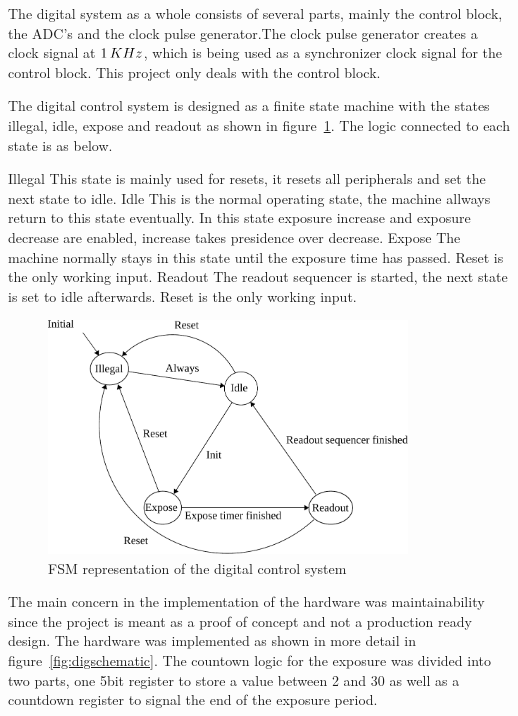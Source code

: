 The digital system as a whole consists of several parts, mainly the control block, the ADC's and the clock pulse generator.The clock pulse generator creates a clock signal at $1 \mskip3mu KHz$, which is being used as a synchronizer clock signal for the control block.
This project only deals with the control block.

The digital control system is designed as a finite state machine with the states illegal, idle, expose and readout as shown in figure~\ref{fig:fsmDiagram}.
The logic connected to each state is as below.

\begin{outline}
  \1 Illegal
  \2 This state is mainly used for resets, it resets all peripherals and set the next state to idle.
  \1 Idle
  \2 This is the normal operating state, the machine allways return to this state eventually.
  \2 In this state exposure increase and exposure decrease are enabled, increase takes presidence over decrease.
  \1 Expose
  \2 The machine normally stays in this state until the exposure time has passed.
  \2 Reset is the only working input.
  \1 Readout
  \2 The readout sequencer is started, the next state is set to idle afterwards.
  \2 Reset is the only working input.
\end{outline}

\begin{figure}[p]
  \centering
  \includegraphics[width=0.85\textwidth]{figures/fsmDiagram}
  \caption{FSM representation of the digital control system}
  \label{fig:fsmDiagram}
\end{figure}

The main concern in the implementation of the hardware was maintainability since the project is meant as a proof of concept and not a production ready design.
The hardware was implemented as shown in more detail in figure~\ref{fig:digschematic}.
The countown logic for the exposure was divided into two parts, one 5bit register to store a value between 2 and 30 as well as a countdown register
to signal the end of the exposure period.


